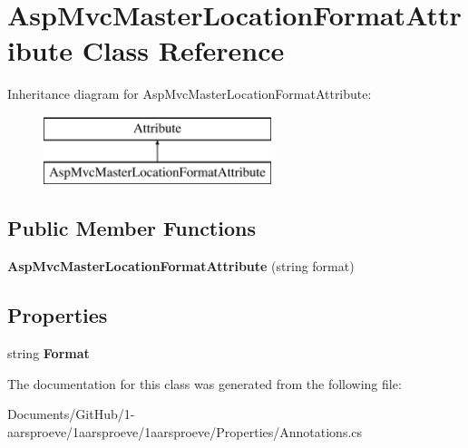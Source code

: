 \hypertarget{class_asp_mvc_master_location_format_attribute}{}\section{Asp\+Mvc\+Master\+Location\+Format\+Attribute Class Reference}
\label{class_asp_mvc_master_location_format_attribute}
Inheritance diagram for Asp\+Mvc\+Master\+Location\+Format\+Attribute\+:\begin{figure}[H]
\begin{center}
\leavevmode
\includegraphics[height=2.000000cm]{class_asp_mvc_master_location_format_attribute}
\end{center}
\end{figure}
\subsection*{Public Member Functions}
\begin{DoxyCompactItemize}
\item 
\hypertarget{class_asp_mvc_master_location_format_attribute_ac71ce5737a8427494201b92935523fd9}{}{\bfseries Asp\+Mvc\+Master\+Location\+Format\+Attribute} (string format)\label{class_asp_mvc_master_location_format_attribute_ac71ce5737a8427494201b92935523fd9}

\end{DoxyCompactItemize}
\subsection*{Properties}
\begin{DoxyCompactItemize}
\item 
\hypertarget{class_asp_mvc_master_location_format_attribute_a12e48477c571f14556915ebdef251912}{}string {\bfseries Format}\label{class_asp_mvc_master_location_format_attribute_a12e48477c571f14556915ebdef251912}

\end{DoxyCompactItemize}


The documentation for this class was generated from the following file\+:\begin{DoxyCompactItemize}
\item 
Documents/\+Git\+Hub/1-\/aarsproeve/1aarsproeve/1aarsproeve/\+Properties/Annotations.\+cs\end{DoxyCompactItemize}
